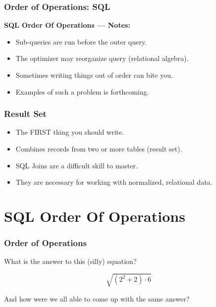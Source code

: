 \documentclass{beamer}
\begin{document}
\begin{frame} %
  \frametitle{Order of Operations: SQL}

  \textbf{SQL Order Of Operations --- Notes:}

  \bigskip
  \begin{itemize}
  \item Sub-queries are run before the outer query.
  \item The optimizer may reorganize query (relational algebra).
  \item Sometimes writing things out of order can bite you.
  \item Examples of such a problem is forthcoming.
  \end{itemize}
  
\end{frame}  

\begin{frame} %
  \frametitle{Result Set}

  \begin{itemize}
  \item The FIRST thing you should write.
  \item Combines records from two or more tables (result set).
  \item SQL Joins are a difficult skill to master.
  \item They are necessary for working with normalized, relational
    data.
  \end{itemize}

\end{frame}  



\section{SQL Order Of Operations} %

\begin{frame} %
  \frametitle{Order of Operations}

  What is the answer to this (silly) equation?

  \bigskip
  \[\sqrt{(2^2+2) \cdot 6}\]

  \bigskip
  \pause
  And how were we all able to come up with the same answer?

\end{frame}
\end{document}
